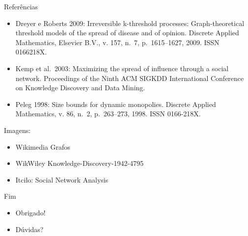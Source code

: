 \documentclass{beamer}
\begin{document}
\begin{frame}{Referências}
\protect\hypertarget{referuxeancias-1}{}
\begin{itemize}
\item
  Dreyer e Roberts 2009: Irreversible k-threshold processes:
  Graph-theoretical threshold models of the spread of disease and of
  opinion. Discrete Applied Mathematics, Elsevier B.V., v. 157, n.~7,
  p.~1615--1627, 2009. ISSN 0166218X.
\item
  Kemp et al.~2003: Maximizing the spread of influence through a social
  network. Proceedings of the Ninth ACM SIGKDD International Conference
  on Knowledge Discovery and Data Mining.
\item
  Peleg 1998: Size bounds for dynamic monopolies. Discrete Applied
  Mathematics, v. 86, n.~2, p.~263--273, 1998. ISSN 0166-218X.
\end{itemize}

Imagens:

\begin{itemize}
\tightlist
\item
  Wikimedia Grafos
\item
  WikWiley Knowledge-Discovery-1942-4795
\item
  Itcilo: Social Network Analysis
\end{itemize}
\end{frame}

\begin{frame}{Fim}
\protect\hypertarget{fim}{}
\begin{itemize}
\tightlist
\item
  Obrigado!
\item
  Dúvidas?
\end{itemize}
\end{frame}
\end{document}
